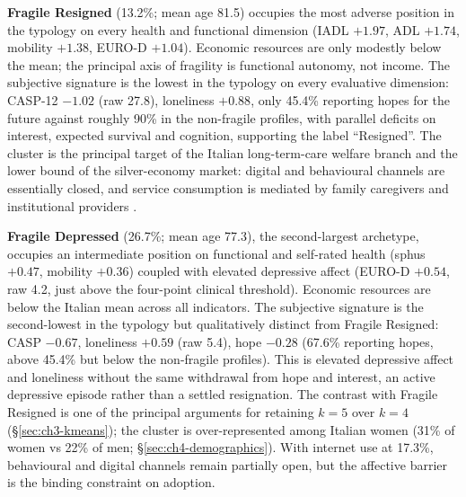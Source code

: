\label{sec:ch4-fragile-resigned}
\textbf{Fragile Resigned} (13.2\%; mean age 81.5) occupies the most adverse position in the typology on every health and functional dimension (IADL $+1.97$, ADL $+1.74$, mobility $+1.38$, EURO-D $+1.04$). Economic resources are only modestly below the mean; the principal axis of fragility is functional autonomy, not income. The subjective signature is the lowest in the typology on every evaluative dimension: CASP-12 $-1.02$ (raw 27.8), loneliness $+0.88$, only 45.4\% reporting hopes for the future against roughly 90\% in the non-fragile profiles, with parallel deficits on interest, expected survival and cognition, supporting the label ``Resigned''. The cluster is the principal target of the Italian long-term-care welfare branch and the lower bound of the silver-economy market: digital and behavioural channels are essentially closed, and service consumption is mediated by family caregivers and institutional providers \citep{saraceno2010}.

\label{sec:ch4-fragile-depressed}
\textbf{Fragile Depressed} (26.7\%; mean age 77.3), the second-largest archetype, occupies an intermediate position on functional and self-rated health (sphus $+0.47$, mobility $+0.36$) coupled with elevated depressive affect (EURO-D $+0.54$, raw 4.2, just above the four-point clinical threshold). Economic resources are below the Italian mean across all indicators. The subjective signature is the second-lowest in the typology but qualitatively distinct from Fragile Resigned: CASP $-0.67$, loneliness $+0.59$ (raw 5.4), hope $-0.28$ (67.6\% reporting hopes, above 45.4\% but below the non-fragile profiles). This is elevated depressive affect and loneliness without the same withdrawal from hope and interest, an active depressive episode rather than a settled resignation. The contrast with Fragile Resigned is one of the principal arguments for retaining $k = 5$ over $k = 4$ (\S\ref{sec:ch3-kmeans}); the cluster is over-represented among Italian women (31\% of women vs 22\% of men; \S\ref{sec:ch4-demographics}). With internet use at 17.3\%, behavioural and digital channels remain partially open, but the affective barrier is the binding constraint on adoption.

